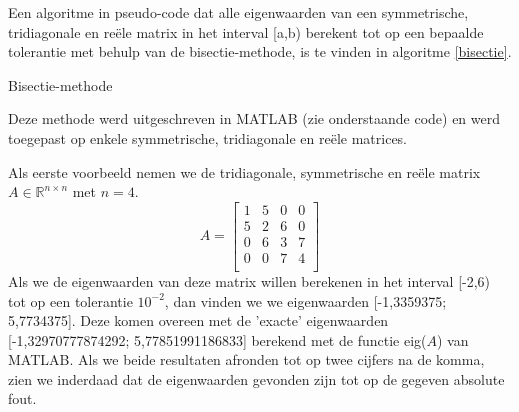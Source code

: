Een algoritme in pseudo-code dat alle eigenwaarden van een symmetrische, tridiagonale en re\"ele matrix in het interval [a,b) berekent tot op een bepaalde tolerantie met behulp van de bisectie-methode, is te vinden in algoritme \ref{bisectie}.

\begin{algorithm}[H]
\centering
\caption{Bisectie-methode}
    \label{bisectie}
\begin{algorithmic}
\State{queue = [[a,b)]}

	\Else
    \EndIf
{}
\EndIf
\EndWhile
\end{algorithmic}
\end{algorithm}


Deze methode werd uitgeschreven in MATLAB (zie onderstaande code) en werd toegepast op enkele symmetrische, tridiagonale en re\"ele matrices.



Als eerste voorbeeld nemen we de tridiagonale, symmetrische en re\"ele matrix $A \in \mathbb{R}^{n \times n}$ met $n=4$.
$$A = \begin{bmatrix} 
1 &5 &0 &0 \\
5 &2 &6 &0 \\
0 &6 &3 &7 \\
0 &0 &7 &4 \\
\end{bmatrix}$$
Als we de eigenwaarden van deze matrix willen berekenen in het interval [-2,6) tot op een tolerantie $10^{-2}$, dan vinden we we eigenwaarden [-1,3359375; 5,7734375]. Deze komen overeen met de 'exacte' eigenwaarden [-1,32970777874292; 5,77851991186833] berekend met de functie eig($A$) van MATLAB. Als we beide resultaten afronden tot op twee cijfers na de komma, zien we inderdaad dat de eigenwaarden gevonden zijn tot op de gegeven absolute fout.

